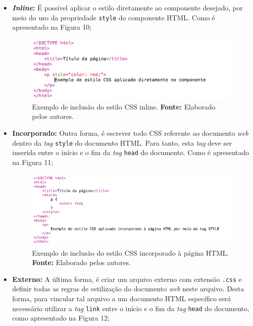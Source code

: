 \begin{itemize}
	\item \textbf{\textit{Inline}:} É possível aplicar o estilo diretamente ao componente desejado, por meio do uso da propriedade \texttt{style} do componente HTML. Como é apresentado na Figura 10;
	
	\begin{figure}[h!]
		\centerline{\includegraphics[scale=0.8]{./imagens/example_css_inline.png}}
		\caption[Exemplo de inclusão do estilo CSS inline]
		{Exemplo de inclusão do estilo CSS inline. \textbf{Fonte:} Elaborado pelos autores.}
		\label{fig:exemplo1}
	\end{figure}
	
	\item \textbf{Incorporado:} Outra forma, é escrever todo CSS referente ao  documento \textit{web} dentro da \textit{tag} \texttt{style} do documento HTML. Para tanto, esta \textit{tag} deve ser inserida entre o início e o fim da \textit{tag} \texttt{head} do documento. Como é apresentado na Figura 11;
	
	\begin{figure}[h!]
		\centerline{\includegraphics[scale=0.8]{./imagens/example_css_incorpored.png}}
		\caption[Exemplo de inclusão do estilo CSS incorporado à página HTML]
		{Exemplo de inclusão do estilo CSS incorporado à página HTML. \textbf{Fonte:} Elaborado pelos autores.}
		\label{fig:exemplo1}
	\end{figure}
	 
	\item \textbf{Externo:} A última forma, é criar um arquivo externo com extensão \texttt{.css} e definir todas as regras de estilização do documento \textit{web} neste arquivo. Desta forma, para vincular tal arquivo a um documento HTML específico será necessário utilizar a \textit{tag} \texttt{link} entre o início e o fim da \textit{tag} \texttt{head} do documento, como apresentado na Figura 12;
	

\end{itemize}
